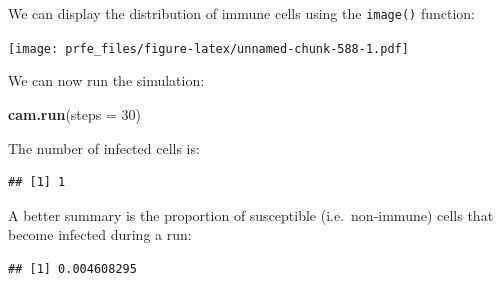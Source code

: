 \documentclass[12pt,a4paper]{book}
\newenvironment{Shaded}{\begin{snugshade}}{\end{snugshade}}
\newcommand{\DataTypeTok}[1]{\textcolor[rgb]{0.13,0.29,0.53}{#1}}
\newcommand{\DecValTok}[1]{\textcolor[rgb]{0.00,0.00,0.81}{#1}}
\newcommand{\KeywordTok}[1]{\textcolor[rgb]{0.13,0.29,0.53}{\textbf{#1}}}
\newcommand{\NormalTok}[1]{#1}
\newcommand{\OperatorTok}[1]{\textcolor[rgb]{0.81,0.36,0.00}{\textbf{#1}}}
\newcommand{\OtherTok}[1]{\textcolor[rgb]{0.56,0.35,0.01}{#1}}
\newcommand{\StringTok}[1]{\textcolor[rgb]{0.31,0.60,0.02}{#1}}
\theoremstyle{definition}
\theoremstyle{definition}
\theoremstyle{definition}
\theoremstyle{remark}
\begin{document}
We can display the distribution of immune cells using the
\texttt{image()} function:

\begin{Shaded}
\end{Shaded}

\texttt{[image: prfe\_files/figure-latex/unnamed-chunk-588-1.pdf]}

We can now run the simulation:

\begin{Shaded}
\begin{Highlighting}[]
\KeywordTok{cam.run}\NormalTok{(}\DataTypeTok{steps =} \DecValTok{30}\NormalTok{)}
\end{Highlighting}
\end{Shaded}

The number of infected cells is:

\begin{Shaded}
\end{Shaded}

\begin{verbatim}
## [1] 1
\end{verbatim}

A better summary is the proportion of susceptible (i.e.~non-immune)
cells that become infected during a run:

\begin{Shaded}
\end{Shaded}

\begin{verbatim}
## [1] 0.004608295
\end{verbatim}
\end{document}
